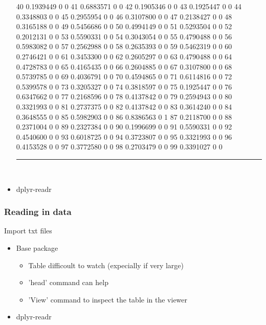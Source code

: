 \documentclass{beamer}
\begin{document}
\begin{frame}[fragile]
\begin{itemize}
\begin{Schunk}
\begin{Soutput}
40   0.1939449   0   0
41   0.6883571   0   0
42   0.1905346   0   0
43   0.1925447   0   0
44   0.3348803   0   0
45   0.2955954   0   0
46   0.3107800   0   0
47   0.2138427   0   0
48   0.3165188   0   0
49   0.5456686   0   0
50   0.4994149   0   0
51   0.5293504   0   0
52   0.2012131   0   0
53   0.5590331   0   0
54   0.3043054   0   0
55   0.4790488   0   0
56   0.5983082   0   0
57   0.2562988   0   0
58   0.2635393   0   0
59   0.5462319   0   0
60   0.2746421   0   0
61   0.3453300   0   0
62   0.2605297   0   0
63   0.4790488   0   0
64   0.4728783   0   0
65   0.4165435   0   0
66   0.2604885   0   0
67   0.3107800   0   0
68   0.5739785   0   0
69   0.4036791   0   0
70   0.4594865   0   0
71   0.6114816   0   0
72   0.5399578   0   0
73   0.3205327   0   0
74   0.3818597   0   0
75   0.1925447   0   0
76   0.6347662   0   0
77   0.2168596   0   0
78   0.4137842   0   0
79   0.2594943   0   0
80   0.3321993   0   0
81   0.2737375   0   0
82   0.4137842   0   0
83   0.3614240   0   0
84   0.3648555   0   0
85   0.5982903   0   0
86   0.8386563   0   1
87   0.2118700   0   0
88   0.2371004   0   0
89   0.2327384   0   0
90   0.1996699   0   0
91   0.5590331   0   0
92   0.4540600   0   0
93   0.6018725   0   0
94   0.3723807   0   0
95   0.3321993   0   0
96   0.4153528   0   0
97   0.3772580   0   0
98   0.2703479   0   0
99   0.3391027   0   0
\end{Soutput}
\end{Schunk}
\rule{\textwidth}{0.4pt}\\
\small
		
		\item dplyr-readr

	\end{itemize}
\end{frame}

\begin{frame}[fragile]
	\frametitle{Reading in data}
	\centering \Large Import txt files
	\begin{itemize}
		\small
		\item Base package
			\begin{itemize}
				\item Table difficoult to watch (expecially if very large) 
				\item 'head' command can help
				\item 'View' command to inspect the table in the viewer
			\end{itemize}
		\item dplyr-readr

	\end{itemize}
\end{frame}
\end{document}
